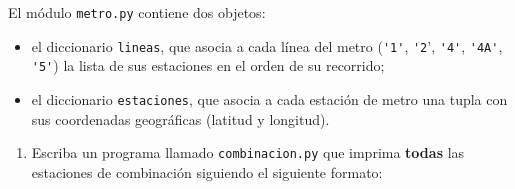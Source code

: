 El módulo \texttt{metro.py} contiene dos objetos:
\begin{itemize}[leftmargin=0pt]
  \item el diccionario \verb!lineas!,
    que asocia a cada línea del metro
    (\verb!'1'!, \verb!'2!', \verb!'4'!, \verb!'4A'!, \verb!'5'!)
    la lista de sus estaciones
    en el orden de su recorrido;
  \item el diccionario \verb!estaciones!,
    que asocia a cada estación de metro
    una tupla con sus coordenadas geográficas
    (latitud y longitud).
\end{itemize}

\begin{enumerate}[leftmargin=0pt,label=\emph{\alph*})]
  \item
    Escriba un programa llamado \texttt{combinacion.py}
    que imprima \textbf{todas} las estaciones de combinación
    siguiendo el siguiente formato:
    
\end{enumerate}


